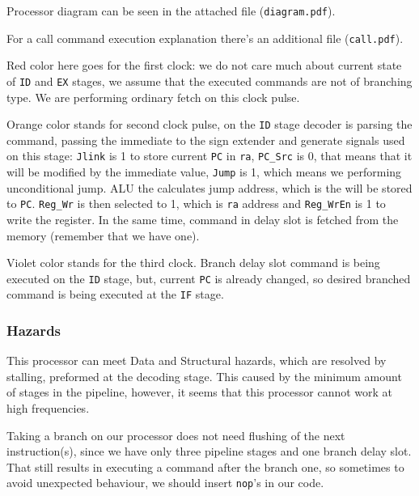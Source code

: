 \documentclass[a4paper]{article}
\begin{document}
Processor diagram can be seen in the attached file (\texttt{diagram.pdf}).

For a call command execution explanation there's an additional file (\texttt{call.pdf}).

Red color here goes for the first clock: we do not care much about current state of \texttt{ID} and \texttt{EX} stages, we assume that the executed commands are not of branching type.
We are performing ordinary fetch on this clock pulse.

Orange color stands for second clock pulse, on the \texttt{ID} stage decoder is parsing the command, passing the immediate to the sign extender and generate signals used on this stage: \texttt{Jlink} is 1 to store current \texttt{PC} in \texttt{ra}, \texttt{PC\_Src} is 0, that means that it will be modified by the immediate value, \texttt{Jump} is 1, which means we performing unconditional jump.
ALU the calculates jump address, which is the will be stored to \texttt{PC}.
\texttt{Reg\_Wr} is then selected to 1, which is \texttt{ra} address and \texttt{Reg\_WrEn} is 1 to write the register.
In the same time, command in delay slot is fetched from the memory (remember that we have one).

Violet color stands for the third clock.
Branch delay slot command is being executed on the \texttt{ID} stage, but, current \texttt{PC} is already changed, so desired branched command is being executed at the \texttt{IF} stage.

\subsubsection{Hazards}

This processor can meet Data and Structural hazards, which are resolved by stalling, preformed at the decoding stage.
This caused by the minimum amount of stages in the pipeline, however, it seems that this processor cannot work at high frequencies.

Taking a branch on our processor does not need flushing of the next instruction(s), since we have only three pipeline stages and one branch delay slot.
That still results in executing a command after the branch one, so sometimes to avoid unexpected behaviour, we should insert \texttt{nop}'s in our code.
\end{document}
